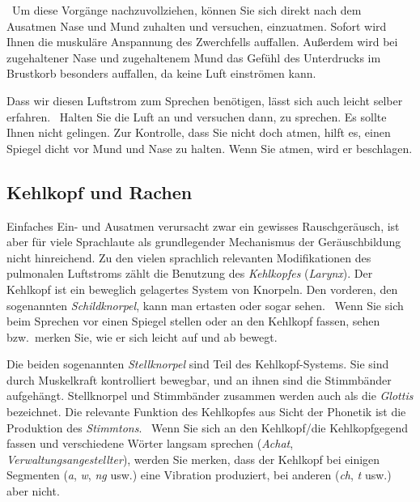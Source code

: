 \TuBegin~Um diese Vorgänge nachzuvollziehen, können Sie sich direkt nach dem Ausatmen Nase und Mund zuhalten und versuchen, einzuatmen.
Sofort wird Ihnen die muskuläre Anspannung des Zwerchfells auffallen.
Außerdem wird bei zugehaltener Nase und zugehaltenem Mund das Gefühl des Unterdrucks im Brustkorb besonders auffallen, da keine Luft einströmen kann.

Dass wir diesen Luftstrom zum Sprechen benötigen, lässt sich auch leicht selber erfahren.
\TuBegin~Halten Sie die Luft an und versuchen dann, zu sprechen.
Es sollte Ihnen nicht gelingen.
Zur Kontrolle, dass Sie nicht doch atmen, hilft es, einen Spiegel dicht vor Mund und Nase zu halten.
Wenn Sie atmen, wird er beschlagen.

\subsection{Kehlkopf und Rachen}

\label{sec:kehlkopf}

Einfaches Ein- und Ausatmen verursacht zwar ein gewisses Rauschgeräusch, ist aber für viele Sprachlaute als grundlegender Mechanismus der Geräuschbildung nicht hinreichend.
Zu den vielen sprachlich relevanten Modifikationen des pulmonalen Luftstroms zählt die Benutzung des \textit{Kehlkopfes} (\textit{Larynx}).
Der Kehlkopf ist ein beweglich gelagertes System von Knorpeln.
Den vorderen, den sogenannten \textit{Schildknorpel}, kann man ertasten oder sogar sehen.
\TuBegin~Wenn Sie sich beim Sprechen vor einen Spiegel stellen oder an den Kehlkopf fassen, sehen bzw.\ merken Sie, wie er sich leicht auf und ab bewegt.

Die beiden sogenannten \textit{Stellknorpel} sind Teil des Kehlkopf-Systems.
Sie sind durch Muskelkraft kontrolliert bewegbar, und an ihnen sind die Stimmbänder aufgehängt.
Stellknorpel und Stimmbänder zusammen werden auch als die \textit{Glottis} bezeichnet.
Die relevante Funktion des Kehlkopfes aus Sicht der Phonetik ist die Produktion des \textit{Stimmtons}.
\TuBegin~Wenn Sie sich an den Kehlkopf/die Kehlkopfgegend fassen und verschiedene Wörter langsam sprechen (\zB \textit{Achat}, \textit{Verwaltungsangestellter}), werden Sie merken, dass der Kehlkopf bei einigen Segmenten (\textit{a}, \textit{w}, \textit{ng} usw.) eine Vibration produziert, bei anderen (\textit{ch}, \textit{t} usw.) aber nicht.

